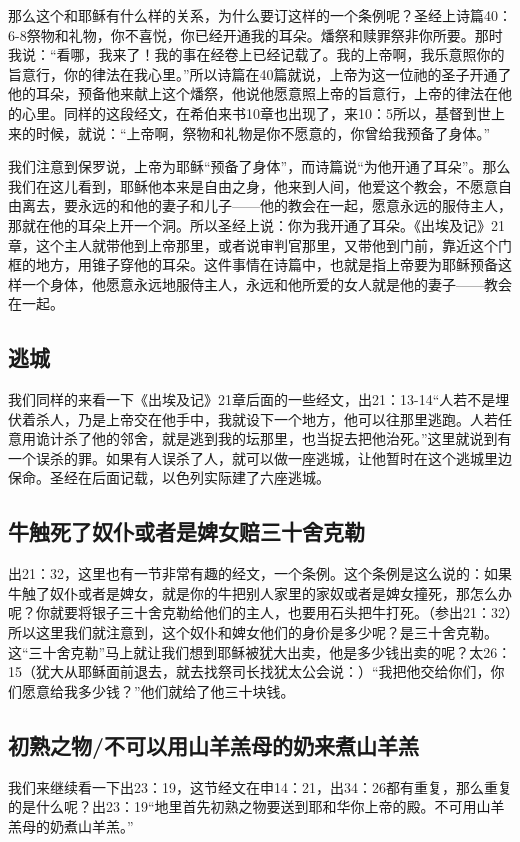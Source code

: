 那么这个和耶稣有什么样的关系，为什么要订这样的一个条例呢？圣经上诗篇40：6-8祭物和礼物，你不喜悦，你已经开通我的耳朵。燔祭和赎罪祭非你所要。那时我说：“看哪，我来了！我的事在经卷上已经记载了。我的上帝啊，我乐意照你的旨意行，你的律法在我心里。”所以诗篇在40篇就说，上帝为这一位祂的圣子开通了他的耳朵，预备他来献上这个燔祭，他说他愿意照上帝的旨意行，上帝的律法在他的心里。同样的这段经文，在希伯来书10章也出现了，来10：5所以，基督到世上来的时候，就说：“上帝啊，祭物和礼物是你不愿意的，你曾给我预备了身体。”

我们注意到保罗说，上帝为耶稣“预备了身体”，而诗篇说“为他开通了耳朵”。那么我们在这儿看到，耶稣他本来是自由之身，他来到人间，他爱这个教会，不愿意自由离去，要永远的和他的妻子和儿子——他的教会在一起，愿意永远的服侍主人，那就在他的耳朵上开一个洞。所以圣经上说：你为我开通了耳朵。《出埃及记》21章，这个主人就带他到上帝那里，或者说审判官那里，又带他到门前，靠近这个门框的地方，用锥子穿他的耳朵。这件事情在诗篇中，也就是指上帝要为耶稣预备这样一个身体，他愿意永远地服侍主人，永远和他所爱的女人就是他的妻子——教会在一起。

\subsection{逃城}
我们同样的来看一下《出埃及记》21章后面的一些经文，出21：13-14“人若不是埋伏着杀人，乃是上帝交在他手中，我就设下一个地方，他可以往那里逃跑。人若任意用诡计杀了他的邻舍，就是逃到我的坛那里，也当捉去把他治死。”这里就说到有一个误杀的罪。如果有人误杀了人，就可以做一座逃城，让他暂时在这个逃城里边保命。圣经在后面记载，以色列实际建了六座逃城。


\subsection{牛触死了奴仆或者是婢女赔三十舍克勒}
出21：32，这里也有一节非常有趣的经文，一个条例。这个条例是这么说的：如果牛触了奴仆或者是婢女，就是你的牛把别人家里的家奴或者是婢女撞死，那怎么办呢？你就要将银子三十舍克勒给他们的主人，也要用石头把牛打死。（参出21：32）所以这里我们就注意到，这个奴仆和婢女他们的身价是多少呢？是三十舍克勒。这“三十舍克勒”马上就让我们想到耶稣被犹大出卖，他是多少钱出卖的呢？太26：15（犹大从耶稣面前退去，就去找祭司长找犹太公会说：）“我把他交给你们，你们愿意给我多少钱？”他们就给了他三十块钱。


\subsection{初熟之物/不可以用山羊羔母的奶来煮山羊羔}
我们来继续看一下出23：19，这节经文在申14：21，出34：26都有重复，那么重复的是什么呢？出23：19“地里首先初熟之物要送到耶和华你上帝的殿。不可用山羊羔母的奶煮山羊羔。”

